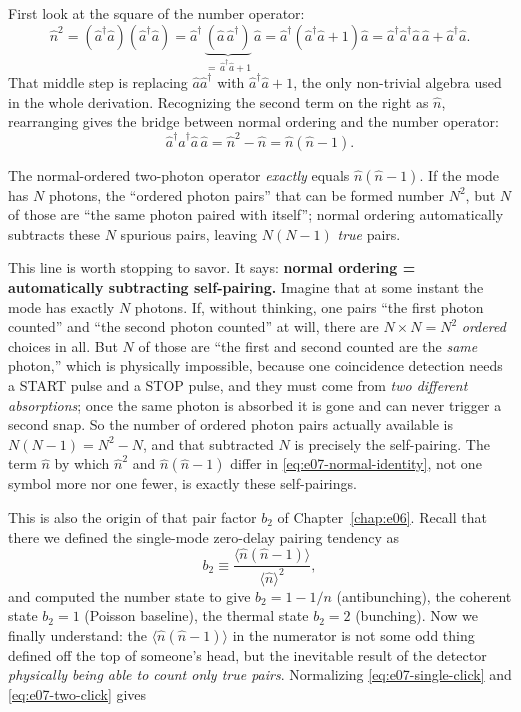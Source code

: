First look at the square of the number operator:
\[
  \hat n^2=(\hat a^\dagger\hat a)(\hat a^\dagger\hat a)
  =\hat a^\dagger\,\underbrace{(\hat a\,\hat a^\dagger)}_{=\,\hat a^\dagger\hat a+1}\,\hat a
  =\hat a^\dagger(\hat a^\dagger\hat a+1)\hat a
  =\hat a^\dagger\hat a^\dagger\hat a\,\hat a+\hat a^\dagger\hat a .
\]
That middle step is replacing \(\hat a\hat a^\dagger\) with \(\hat a^\dagger\hat a+1\), the only non-trivial algebra used in the whole derivation. Recognizing the second term on the right as \(\hat n\), rearranging gives the bridge between normal ordering and the number operator:
\begin{equation}
  \hat a^\dagger\hat a^\dagger\hat a\,\hat a
  =\hat n^2-\hat n
  =\hat n(\hat n-1).
  \label{eq:e07-normal-identity}
\end{equation}
\begin{formulaexplain}
The normal-ordered two-photon operator \emph{exactly} equals \(\hat n(\hat n-1)\). If the mode has \(N\) photons, the ``ordered photon pairs'' that can be formed number \(N^2\), but \(N\) of those are ``the same photon paired with itself''; normal ordering automatically subtracts these \(N\) spurious pairs, leaving \(N(N-1)\) \emph{true} pairs.
\end{formulaexplain}

This line is worth stopping to savor. It says: \textbf{normal ordering = automatically subtracting self-pairing.} Imagine that at some instant the mode has exactly \(N\) photons. If, without thinking, one pairs ``the first photon counted'' and ``the second photon counted'' at will, there are \(N\times N=N^2\) \emph{ordered} choices in all. But \(N\) of those are ``the first and second counted are the \emph{same} photon,'' which is physically impossible, because one coincidence detection needs a START pulse and a STOP pulse, and they must come from \emph{two different absorptions}; once the same photon is absorbed it is gone and can never trigger a second snap. So the number of ordered photon pairs actually available is \(N(N-1)=N^2-N\), and that subtracted \(N\) is precisely the self-pairing. The term \(\hat n\) by which \(\hat n^2\) and \(\hat n(\hat n-1)\) differ in \eqref{eq:e07-normal-identity}, not one symbol more nor one fewer, is exactly these self-pairings.

This is also the origin of that pair factor \(b_2\) of Chapter~\ref{chap:e06}. Recall that there we defined the single-mode zero-delay pairing tendency as
\[
  b_2\equiv\frac{\langle\hat n(\hat n-1)\rangle}{\langle\hat n\rangle^2},
\]
and computed the number state to give \(b_2=1-1/n\) (antibunching), the coherent state \(b_2=1\) (Poisson baseline), the thermal state \(b_2=2\) (bunching). Now we finally understand: the \(\langle\hat n(\hat n-1)\rangle\) in the numerator is not some odd thing defined off the top of someone's head, but the inevitable result of the detector \emph{physically being able to count only true pairs}. Normalizing \eqref{eq:e07-single-click} and \eqref{eq:e07-two-click} gives

